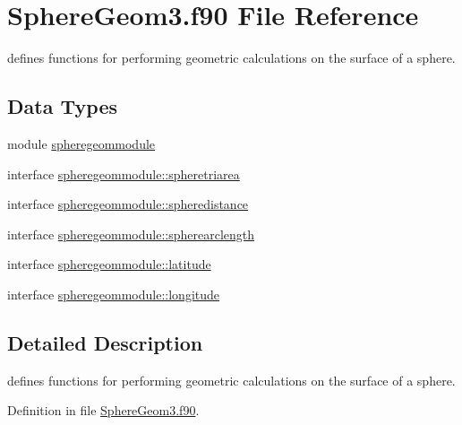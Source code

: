 \hypertarget{_sphere_geom3_8f90}{\section{Sphere\+Geom3.\+f90 File Reference}
\label{_sphere_geom3_8f90}
}


defines functions for performing geometric calculations on the surface of a sphere.  


\subsection*{Data Types}
\begin{DoxyCompactItemize}
\item 
module \hyperlink{classspheregeommodule}{spheregeommodule}
\item 
interface \hyperlink{interfacespheregeommodule_1_1spheretriarea}{spheregeommodule\+::spheretriarea}
\item 
interface \hyperlink{interfacespheregeommodule_1_1spheredistance}{spheregeommodule\+::spheredistance}
\item 
interface \hyperlink{interfacespheregeommodule_1_1spherearclength}{spheregeommodule\+::spherearclength}
\item 
interface \hyperlink{interfacespheregeommodule_1_1latitude}{spheregeommodule\+::latitude}
\item 
interface \hyperlink{interfacespheregeommodule_1_1longitude}{spheregeommodule\+::longitude}
\end{DoxyCompactItemize}


\subsection{Detailed Description}
defines functions for performing geometric calculations on the surface of a sphere. 



Definition in file \hyperlink{_sphere_geom3_8f90_source}{Sphere\+Geom3.\+f90}.

